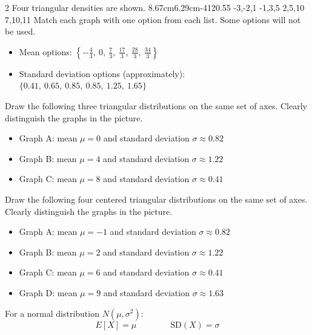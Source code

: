 \begin{multicols}{2}
		\vspace{-0.35cm}
		Four triangular densities are shown.
		\vspace{-0.7cm}
		\TriangularFourGraph
		{8.67cm}{6.29cm}{-4}{12}{0.55}
		{-3,-2,1}
		{-1,3,5}
		{2,5,10}
		{7,10,11}
		Match each graph with one option from each list. Some options will not be used.
		\begin{itemize}
			\item Mean options: $\left\{-\frac{4}{3},\ 0,\ \frac{7}{3},\ \frac{17}{3},\ \frac{28}{3},\ \frac{34}{3} \right\}$
			\item Standard deviation options (approximately): $\{0.41,\ 0.65,\ 0.85,\ 0.85,\ 1.25,\ 1.65\}$
		\end{itemize}
		
		\vspace{-0.35cm}
		Draw the following three triangular distributions on the same set of axes. Clearly distinguish the graphs in the picture.
		\begin{itemize}
			\item Graph A: mean $\mu=0$ and standard deviation $\sigma\approx0.82$
			\item Graph B: mean $\mu=4$ and standard deviation $\sigma\approx1.22$
			\item Graph C: mean $\mu=8$ and standard deviation $\sigma\approx0.41$
		\end{itemize}
		
		
		\vspace{-0.35cm}
		Draw the following four centered triangular distributions on the same set of axes. Clearly distinguish the graphs in the picture.
		\begin{itemize}
			\item Graph A: mean $\mu=-1$ and standard deviation $\sigma\approx0.82$
			\item Graph B: mean $\mu=2$ and standard deviation $\sigma\approx1.22$
			\item Graph C: mean $\mu=6$ and standard deviation $\sigma\approx0.41$
			\item Graph D: mean $\mu=9$ and standard deviation $\sigma\approx1.63$
		\end{itemize}
		
		\vspace{-0.35cm}
		For a normal distribution $N(\mu,\sigma^2)$:
		\[
		E[X]=\mu
		\qquad \qquad
		\mathrm{SD}(X)=\sigma
		\]
		

\end{multicols}
